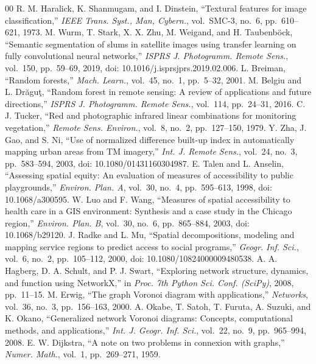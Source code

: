 \documentclass[conference]{IEEEtran}
\begin{document}
\begin{thebibliography}{00}
 R. M. Haralick, K. Shanmugam, and I. Dinstein, ``Textural features for image classification,'' \textit{IEEE Trans. Syst., Man, Cybern.}, vol.~SMC-3, no.~6, pp.~610--621, 1973.
 M. Wurm, T. Stark, X. X. Zhu, M. Weigand, and H. Taubenb\"{o}ck, ``Semantic segmentation of slums in satellite images using transfer learning on fully convolutional neural networks,'' \textit{ISPRS J. Photogramm. Remote Sens.}, vol.~150, pp.~59--69, 2019, doi: 10.1016/j.isprsjprs.2019.02.006.
 L. Breiman, ``Random forests,'' \textit{Mach. Learn.}, vol.~45, no.~1, pp.~5--32, 2001.
 M. Belgiu and L. Dr\u{a}gu\c{t}, ``Random forest in remote sensing: A review of applications and future directions,'' \textit{ISPRS J. Photogramm. Remote Sens.}, vol.~114, pp.~24--31, 2016.
 C. J. Tucker, ``Red and photographic infrared linear combinations for monitoring vegetation,'' \textit{Remote Sens. Environ.}, vol.~8, no.~2, pp.~127--150, 1979.
 Y. Zha, J. Gao, and S. Ni, ``Use of normalized difference built-up index in automatically mapping urban areas from TM imagery,'' \textit{Int. J. Remote Sens.}, vol.~24, no.~3, pp.~583--594, 2003, doi: 10.1080/01431160304987.
 E. Talen and L. Anselin, ``Assessing spatial equity: An evaluation of measures of accessibility to public playgrounds,'' \textit{Environ. Plan. A}, vol.~30, no.~4, pp.~595--613, 1998, doi: 10.1068/a300595.
 W. Luo and F. Wang, ``Measures of spatial accessibility to health care in a GIS environment: Synthesis and a case study in the Chicago region,'' \textit{Environ. Plan. B}, vol.~30, no.~6, pp.~865--884, 2003, doi: 10.1068/b29120.
 J. Radke and L. Mu, ``Spatial decompositions, modeling and mapping service regions to predict access to social programs,'' \textit{Geogr. Inf. Sci.}, vol.~6, no.~2, pp.~105--112, 2000, doi: 10.1080/10824000009480538.
 A. A. Hagberg, D. A. Schult, and P. J. Swart, ``Exploring network structure, dynamics, and function using NetworkX,'' in \textit{Proc. 7th Python Sci. Conf. (SciPy)}, 2008, pp.~11--15.
 M. Erwig, ``The graph Voronoi diagram with applications,'' \textit{Networks}, vol.~36, no.~3, pp.~156--163, 2000.
 A. Okabe, T. Satoh, T. Furuta, A. Suzuki, and K. Okano, ``Generalized network Voronoi diagrams: Concepts, computational methods, and applications,'' \textit{Int. J. Geogr. Inf. Sci.}, vol.~22, no.~9, pp.~965--994, 2008.
 E. W. Dijkstra, ``A note on two problems in connexion with graphs,'' \textit{Numer. Math.}, vol.~1, pp.~269--271, 1959.

\end{thebibliography}
\end{document}
